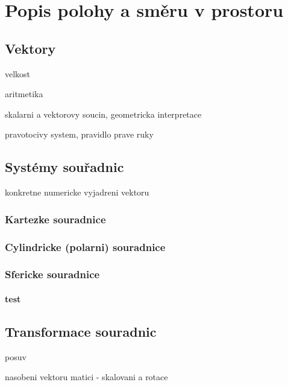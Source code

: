 \chapter{Popis polohy a směru v prostoru}

\section{Vektory}

velkost

aritmetika

skalarni a vektorovy soucin, geometricka interpretace

pravotocivy system, pravidlo prave ruky

\section{Systémy souřadnic}

konkretne numericke vyjadreni vektoru

\subsection{Kartezke souradnice}

\subsection{Cylindricke (polarni) souradnice}

\subsection{Sfericke souradnice}

\subsubsection{test}

\section{Transformace souradnic}

posuv

nasobeni vektoru matici - skalovani a rotace

